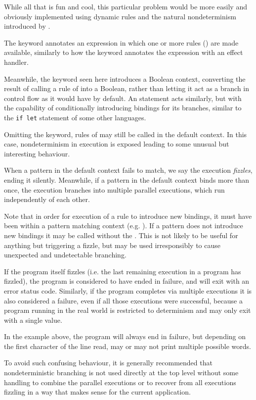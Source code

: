 While all that is fun and cool, this particular problem would be
more easily and obviously implemented using dynamic rules
and the natural nondeterminism introduced by \Law{}.


The  keyword annotates an expression in which one or more
rules () are made available, similarly to how the 
keyword annotates the expression with an effect handler.

Meanwhile, the  keyword seen here introduces a Boolean context,
converting the result of calling a rule of \Law{} into a Boolean,
rather than letting it act as a branch in control flow as it would
have by default. An  statement acts similarly, but with the
capability of conditionally introducing bindings for its branches,
similar to the \texttt{if let} statement of some other languages.


Omitting the  keyword, rules of \Law{} may still be called
in the default context. In this case, nondeterminism in execution
is exposed leading to some unusual but interesting behaviour.

When a pattern in the default context fails to match, we say the execution
\emph{fizzles}, ending it silently. Meanwhile, if a pattern in the default
context binds more than once, the execution branches into multiple parallel
executions, which run independently of each other.

Note that in order for execution of a rule to introduce new bindings,
it must have been within a pattern matching context (e.g. ).
If a pattern does not introduce new bindings it may be called without
the . This is not likely to be useful for anything but
triggering a fizzle, but may be used irresponsibly to cause unexpected
and undetectable branching.

If the program itself fizzles (i.e. the last remaining execution in
a program has fizzled), the program is considered to have ended in
failure, and will exit with an error status code. Similarly, if the
program completes via multiple executions it is also considered
a failure, even if all those executions were successful, because a
program running in the real world is restricted to determinism and
may only exit with a single value.

In the example above, the program will always end in failure, but
depending on the first character of the line read, may or may not
print multiple possible words.

To avoid such confusing behaviour, it is generally recommended that
nondeterministic branching is not used directly at the top level without
some handling to combine the parallel executions or to recover from all
executions fizzling in a way that makes sense for the current application.
